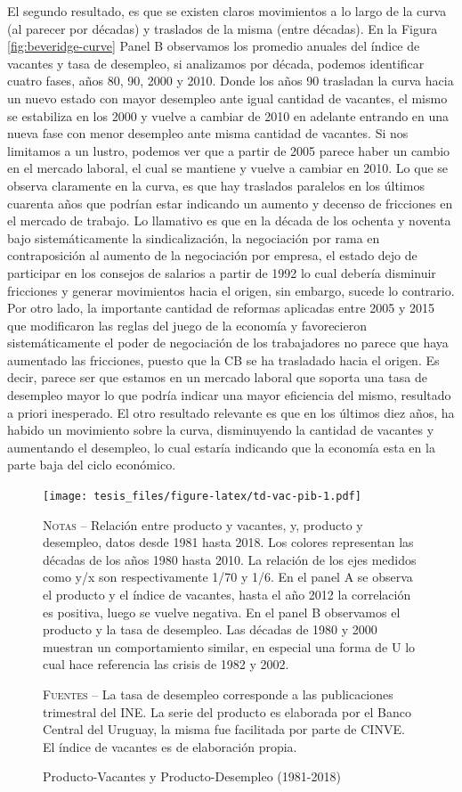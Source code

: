 \documentclass[12pt,oneside]{reedthesis}
\begin{document}
El segundo resultado, es que se existen claros movimientos a lo largo de la curva (al parecer por décadas) y traslados de la misma (entre décadas).
En la Figura \ref{fig:beveridge-curve} Panel B observamos los promedio anuales del índice de vacantes y tasa de desempleo, si analizamos por década, podemos identificar cuatro fases, años 80, 90, 2000 y 2010. Donde los años 90 trasladan la curva hacia un nuevo estado con mayor desempleo ante igual cantidad de vacantes, el mismo se estabiliza en los 2000 y vuelve a cambiar de 2010 en adelante entrando en una nueva fase con menor desempleo ante misma cantidad de vacantes. Si nos limitamos a un lustro, podemos ver que a partir de 2005 parece haber un cambio en el mercado laboral, el cual se mantiene y vuelve a cambiar en 2010. Lo que se observa claramente en la curva, es que hay traslados paralelos en los últimos cuarenta años que podrían estar indicando un aumento y decenso de fricciones en el mercado de trabajo. Lo llamativo es que en la década de los ochenta y noventa bajo sistemáticamente la sindicalización, la negociación por rama en contraposición al aumento de la negociación por empresa, el estado dejo de participar en los consejos de salarios a partir de 1992 lo cual debería disminuir fricciones y generar movimientos hacia el origen, sin embargo, sucede lo contrario. Por otro lado, la importante cantidad de reformas aplicadas entre 2005 y 2015 que modificaron las reglas del juego de la economía y favorecieron sistemáticamente el poder de negociación de los trabajadores no parece que haya aumentado las fricciones, puesto que la CB se ha trasladado hacia el origen. Es decir, parece ser que estamos en un mercado laboral que soporta una tasa de desempleo mayor lo que podría indicar una mayor eficiencia del mismo, resultado a priori inesperado. El otro resultado relevante es que en los últimos diez años, ha habido un movimiento sobre la curva, disminuyendo la cantidad de vacantes y aumentando el desempleo, lo cual estaría indicando que la economía esta en la parte baja del ciclo económico.
\begin{figure}
\texttt{[image: tesis\_files/figure-latex/td-vac-pib-1.pdf]}
\caption{Producto-Vacantes y Producto-Desempleo (1981-2018)}\label{fig:td-vac-pib}\textsc{}

\footnotesize\textsc{Notas} -- Relación entre producto y vacantes, y,  producto y desempleo, datos desde 1981 hasta 2018. Los colores representan las décadas de los años 1980 hasta 2010. La relación de los ejes medidos como y/x son respectivamente 1/70 y 1/6. En el panel A se observa el producto y el índice de vacantes, hasta el año 2012 la correlación es positiva, luego se vuelve negativa. En el panel B observamos el producto y la tasa de desempleo. Las décadas de 1980 y 2000 muestran un comportamiento similar, en especial una forma de U lo cual hace referencia las crisis de 1982 y 2002.

\textsc{Fuentes} -- La tasa de desempleo corresponde a las publicaciones trimestral del INE. La serie del producto es elaborada por el Banco Central del Uruguay, la misma fue facilitada por parte de CINVE. El índice de vacantes es de elaboración propia.
\end{figure}
\end{document}
